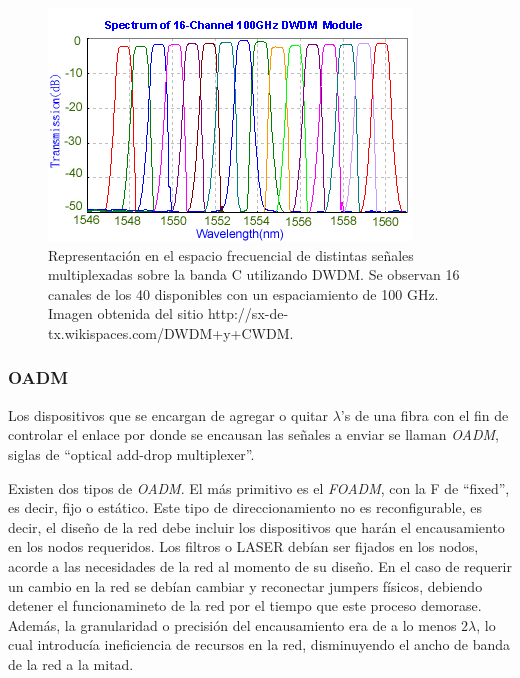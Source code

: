 \begin{figure}[H]
  \centering
  \includegraphics[scale=1]{Imagenes/DWDM_channels.png}
  \caption{Representación en el espacio frecuencial de distintas
    señales multiplexadas sobre la banda C utilizando DWDM. Se
    observan 16 canales de los 40 disponibles con un espaciamiento de
    100 GHz. Imagen obtenida del sitio
    http://sx-de-tx.wikispaces.com/DWDM+y+CWDM.}
  \label{fig:dwdmchannels}
\end{figure}


\subsubsection{OADM}
\label{sec:oadm}

Los dispositivos que se encargan de agregar o quitar $\lambda$'s de
una fibra con el fin de controlar el enlace por donde se encausan las
señales a enviar se llaman \emph{OADM}, siglas de ``optical add-drop
multiplexer''.

Existen dos tipos de \emph{OADM}. El más primitivo es el \emph{FOADM},
con la F de ``fixed'', es decir, fijo o estático. Este tipo de
direccionamiento no es reconfigurable, es decir, el diseño de la red
debe incluir los dispositivos que harán el encausamiento en los nodos
requeridos. Los filtros o LASER debían ser fijados en los nodos,
acorde a las necesidades de la red al momento de su diseño. En el caso
de requerir un cambio en la red se debían cambiar y reconectar jumpers
físicos, debiendo detener el funcionamineto de la red por el tiempo
que este proceso demorase. Además, la granularidad o precisión del
encausamiento era de a lo menos $2\lambda$, lo cual introducía
ineficiencia de recursos en la red, disminuyendo el ancho de banda de
la red a la mitad.


